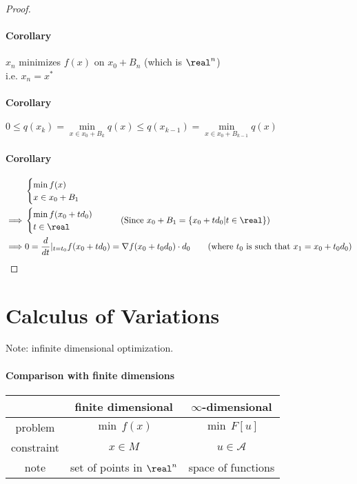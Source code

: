 \documentclass[11pt]{article}
\begin{document}
\begin{proof}
\paragraph{Corollary} $x_n$ minimizes $f(x)$ on $x_0 + B_n$ (which is $\real^n$) \\
i.e. $x_n = x^*$ 
\paragraph{Corollary} $0 \leq q(x_{k}) = \underset{x \in x_0 + B_k}{\min} q(x) \leq q(x_{k-1}) = \underset{x \in x_0 + B_{k-1}}{\min} q(x)$
\paragraph{Corollary}
\begin{align}
&\begin{cases}
	\min f(x) \\
	x \in x_0 + B_1
\end{cases} \\
\implies &\begin{cases}
	\min f(x_0 + td_0) \\
	t \in \real
\end{cases}\tag{Since $x_0 + B_1 = \{x_0 + td_0 | t \in \real \}$} \\
\implies &0 = \frac{d}{dt}|_{t=t_0} f(x_0 + td_0) = \nabla f(x_0 + t_0d_0) \cdot d_0 \tag{where $t_0$ is such that $x_1 = x_0 + t_0 d_0$}
\end{align}
\end{proof}

\section{Calculus of Variations}
Note: infinite dimensional optimization.
\paragraph{Comparison with finite dimensions}
\begin{center}
\begin{tabular}{ |c|c|c| } 
 \hline
 & finite dimensional & $\infty$-dimensional \\
 \hline
 problem & $\min \, f(x)$ & $\min \, F[u]$ \\
 \hline
 constraint & $x \in M$ & $u \in \mathcal{A}$ \\ 
 \hline
 note & set of points in $\real^n$ & space of functions \\
 \hline
\end{tabular}
\end{center}
\end{document}

